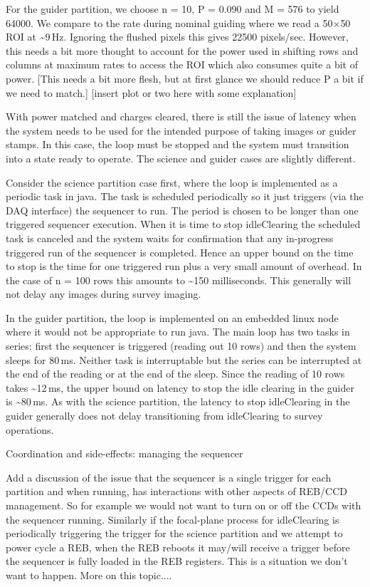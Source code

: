 For the guider partition, we choose n = 10, P = 0.090 and M = 576 to yield 64000.  We compare to the rate during nominal guiding where we read a 50$\times$50 ROI at \sim9\,Hz.  Ignoring the flushed pixels this gives 22500 pixels/sec. However, this needs a bit more thought to account for the power used in shifting rows and columns at maximum rates to access the ROI which also consumes quite a bit of power.  
[This needs a bit more flesh, but at first glance we should reduce P a bit if we need to match.] 
[insert plot or two here with some explanation]

With power matched and charges cleared, there is still the issue of latency when the system needs to be used for the intended purpose of taking images or guider stamps. In this case, the loop must be stopped and the system must transition into a state ready to operate. The science and guider cases are slightly different.

Consider the science partition case first, where the loop is implemented as a periodic task in java. The task is scheduled periodically so it just triggers (via the DAQ interface) the sequencer to run. The period is chosen to be longer than one triggered sequencer execution. When it is time to stop idleClearing the scheduled task is canceled and the system waits for confirmation that any in-progress triggered run of the sequencer is completed.  Hence an upper bound on the time to stop is the time for one triggered run plus a very small amount of overhead.  In the case of n = 100 rows this amounts to \sim150 milliseconds. This generally will not delay any images during survey imaging.

In the guider partition, the loop is implemented on an embedded linux node where it would not be appropriate to run java.  The main loop has two tasks in series: first the sequencer is triggered (reading out 10 rows) and then the system sleeps for 80\,ms.  Neither task is interruptable but the series can be interrupted at the end of the reading or at the end of the sleep.  Since the reading of 10 rows takes \sim12\,ms, the upper bound on latency to stop the idle clearing in the guider is \sim80\,ms. As with the science partition, the latency to stop idleClearing in the guider generally does not delay transitioning from idleClearing to survey operations.

Coordination and side-effects: managing the sequencer

Add a discussion of the issue that the sequencer is a single trigger for each partition and when running, has interactions with other aspects of REB/CCD management.  So for example we would not want to turn on or off the CCDs with the sequencer running. Similarly if the focal-plane process for idleClearing is periodically triggering the trigger for the science partition and we attempt to power cycle a REB, when the REB reboots it may/will receive a trigger before the sequencer is fully loaded in the REB registers.  This is a situation we don't want to happen.  More on this topic....